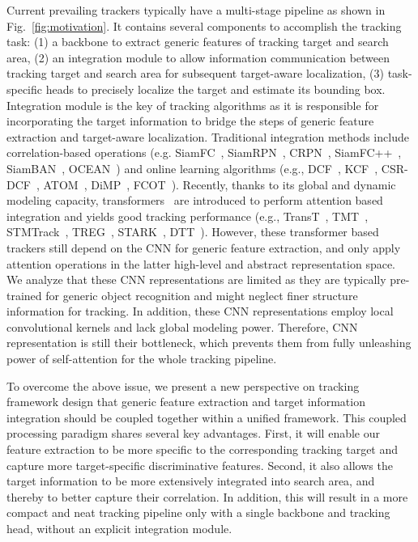 Current prevailing trackers typically have a multi-stage pipeline as shown in Fig.~\ref{fig:motivation}. It contains several components to accomplish the tracking task: (1) a backbone to extract generic features of tracking target and search area, (2) an integration module to allow information communication between tracking target and search area for subsequent target-aware localization, (3) task-specific heads to precisely localize the target and estimate its bounding box. Integration module is the key of tracking algorithms as it is responsible for incorporating the target information to bridge the steps of generic feature extraction and target-aware localization. 
Traditional integration methods include correlation-based operations (e.g. SiamFC~\cite{siamfc}, SiamRPN~\cite{siamrpn}, CRPN~\cite{CRPN}, SiamFC++~\cite{siamfc++}, SiamBAN~\cite{siamban}, OCEAN~\cite{ocean}) and online learning algorithms (e.g., DCF~\cite{dcf_}, KCF~\cite{kcf}, CSR-DCF~\cite{csr_dcf}, ATOM~\cite{atom}, DiMP~\cite{dimp}, FCOT~\cite{fcot}). Recently, thanks to its global and dynamic modeling capacity, transformers~\cite{transformer} are introduced to perform attention based integration and yields good tracking performance (e.g., TransT~\cite{tt}, TMT~\cite{tmt}, STMTrack~\cite{stmtrack}, TREG~\cite{treg}, STARK~\cite{stark}, DTT~\cite{dtt}). 
However, these transformer based trackers still depend on the CNN for generic feature extraction, and only apply attention operations in the latter high-level and abstract representation space. We analyze that these CNN representations are limited as they are typically pre-trained for generic object recognition and might neglect finer structure information for tracking. In addition, these CNN representations employ local convolutional kernels and lack global modeling power. Therefore, CNN representation is still their bottleneck, which prevents them from fully unleashing power of self-attention for the whole tracking pipeline.

To overcome the above issue, we present a new perspective on tracking framework design that generic feature extraction and target information integration should be coupled together within a unified framework. This coupled processing paradigm shares several key advantages. First, it will enable our feature extraction to be more specific to the corresponding tracking target and capture more target-specific discriminative features. Second, it also allows the target information to be more extensively integrated into search area, and thereby to better capture their correlation. In addition, this will result in a more compact and neat tracking pipeline only with a single backbone and tracking head, without an explicit integration module.

